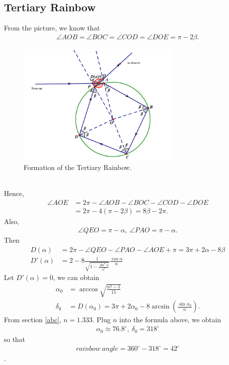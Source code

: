 \documentclass{article}
\begin{document}
\begin{spacing}{1.5}
\subsection{Tertiary Rainbow}
From the picture, we know that \begin{align*}\angle AOB=\angle BOC = \angle COD =\angle DOE = \pi -2 \beta.\end{align*}
\begin{figure}[!htb]
\centering
\includegraphics[width=8cm]{2_5.png}
\caption{Formation of the Tertiary Rainbow.}
\end{figure}
\\
Hence, \begin{align*}\angle AOE &= 2\pi - \angle AOB -\angle BOC -\angle COD - \angle DOE\\&=2\pi- 4(\pi - 2\beta)=8\beta - 2\pi.\end{align*}
Also, \begin{align*}\angle QEO = \pi -\alpha, \ \angle PAO =\pi -\alpha.\end{align*} 
Then \begin{align*}
D(\alpha)&=2\pi - \angle QEO -\angle PAO - \angle AOE +\pi = 3\pi + 2\alpha -8\beta\\
D'(\alpha)&=2-8\frac{1}{\sqrt {1-\frac{\sin^2\alpha}{n^2}}}\frac{\cos \alpha}{n}
\end{align*}
Let $D'(\alpha)=0$, we can obtain 
\begin{align*}\alpha_0&= \arccos \sqrt{\frac{n^2-1}{15}}\\ \delta_0 &= D(\alpha_0)=3\pi + 2\alpha_0 -  8\arcsin(\frac{\sin \alpha_0}{n}).\end{align*}
From section \ref{abc}, $n=1.333$. Plug $n$ into the formula above, we obtain \begin{align*}\alpha _0\approx 76.8^{\circ}, \ \delta_0=318^{\circ}\end{align*} 
so that\begin{align*}rainbow\ angle=360^{\circ} - 318^{\circ}=42^{\circ}\end{align*}.\\

\end{spacing}
\end{document}
